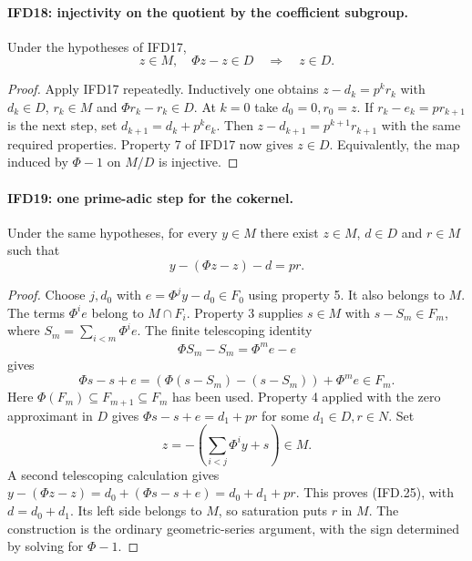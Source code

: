 \paragraph{IFD18: injectivity on the quotient by the coefficient subgroup.}
\label{claim:IFD18}
Under the hypotheses of IFD17,
\[
                 z\in M,\quad \Phi z-z\in D
                                    \quad\Longrightarrow\quad z\in D.
                                                               \tag{IFD.24}
\]

\begin{proof}
Apply IFD17 repeatedly. Inductively one obtains
$z-d_k=p^kr_k$ with $d_k\in D$, $r_k\in M$ and
$\Phi r_k-r_k\in D$. At $k=0$ take $d_0=0,r_0=z$.
If $r_k-e_k=pr_{k+1}$ is the next step, set
$d_{k+1}=d_k+p^ke_k$. Then
$z-d_{k+1}=p^{k+1}r_{k+1}$ with the same required properties.
Property 7 of IFD17 now gives $z\in D$.
Equivalently, the map induced by $\Phi-1$ on $M/D$ is injective.
\end{proof}

\paragraph{IFD19: one prime-adic step for the cokernel.}
\label{claim:IFD19}
Under the same hypotheses, for every $y\in M$ there exist
$z\in M$, $d\in D$ and $r\in M$ such that
\[
                         y-(\Phi z-z)-d=pr.                \tag{IFD.25}
\]

\begin{proof}
Choose $j,d_0$ with $e=\Phi^jy-d_0\in F_0$ using property 5.
It also belongs to $M$. The terms $\Phi^ie$ belong to $M\cap F_i$.
Property 3 supplies $s\in M$ with
$s-S_m\in F_m$, where $S_m=\sum_{i<m}\Phi^ie$.
The finite telescoping identity
\[
                          \Phi S_m-S_m=\Phi^me-e
\]
gives
\[
 \Phi s-s+e=(\Phi(s-S_m)-(s-S_m))+\Phi^me\in F_m.
\]
Here $\Phi(F_m)\subseteq F_{m+1}\subseteq F_m$ has been used.
Property 4 applied with the zero approximant in $D$ gives
$\Phi s-s+e=d_1+pr$ for some $d_1\in D,r\in N$.
Set
\[
                     z=-\left(\sum_{i<j}\Phi^iy+s\right)\in M.
\]
A second telescoping calculation gives
$y-(\Phi z-z)=d_0+(\Phi s-s+e)=d_0+d_1+pr$.
This proves (IFD.25), with $d=d_0+d_1$.
Its left side belongs to $M$, so saturation puts $r$ in $M$.
The construction is the ordinary geometric-series argument, with
the sign determined by solving for $\Phi-1$.
\end{proof}

